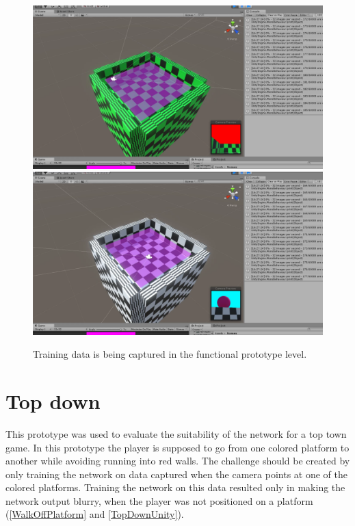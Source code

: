 \begin{figure}[p]
  \centering
  \includegraphics[width=\imgWidth]{images/workflow/Functional1.png} \\[\picVdist]
  \includegraphics[width=\imgWidth]{images/workflow/Functional2.png}
  \caption{Training data is being captured in the functional prototype level.}
  \label{FunctionalCapture}
\end{figure}

\section{Top down}
This prototype was used to evaluate the suitability of the network for a top town game. In this prototype the player is supposed to go from one colored platform to another while avoiding running into red walls. The challenge should be created by only training the network on data captured when the camera points at one of the colored platforms. Training the network on this data resulted only in making the network output blurry, when the player was not positioned on a platform (\cref{WalkOffPlatform} and \cref{TopDownUnity}).

